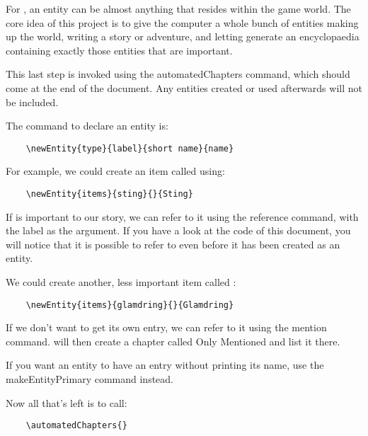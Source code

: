 \documentclass[openany]{book}
\begin{document}
For \LoreTex{}, an entity can be almost anything that resides within the game world. The core idea of this project is to give the computer a whole bunch of entities making up the world, writing a story or adventure, and letting \LoreTex{} generate an encyclopaedia containing exactly those entities that are important.

This last step is invoked using the automatedChapters command, which should come at the end of the document. Any entities created or used afterwards will not be included.

The command to declare an entity is:
\begin{verbatim}
	\newEntity{type}{label}{short name}{name}
\end{verbatim}
For example, we could create an item called  using:
\begin{verbatim}
	\newEntity{items}{sting}{}{Sting}
\end{verbatim}
If  is important to our story, we can refer to it using the reference command, with the label as the argument. If you have a look at the code of this document, you will notice that it is possible to refer to  even before it has been created as an entity.

We could create another, less important item called :
\begin{verbatim}
	\newEntity{items}{glamdring}{}{Glamdring}
\end{verbatim}
If we don't want  to get its own entry, we can refer to it using the mention command. \LoreTex{} will then create a chapter called Only Mentioned and list it there.

If you want an entity to have an entry without printing its name, use the makeEntityPrimary command instead.


Now all that's left is to call:
\begin{verbatim}
	\automatedChapters{}
\end{verbatim}

\automatedChapters{}
\end{document}

